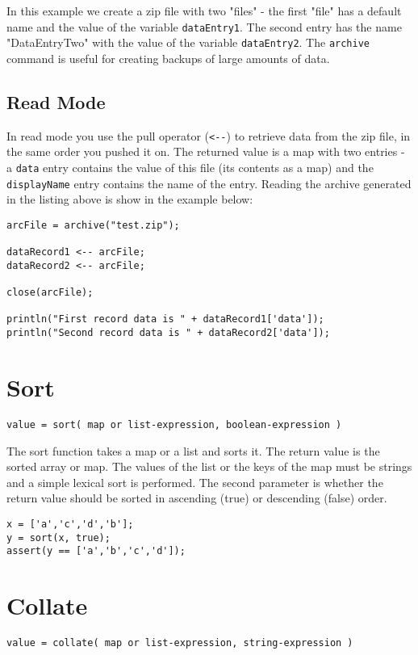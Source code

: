 In this example we create a zip file with two "files" - the first "file" has a default name and the value of the variable \Verb+dataEntry1+. The second entry has the name "DataEntryTwo" with the value of the variable \verb+dataEntry2+. The \verb+archive+ command is useful for creating backups of large amounts of \Rapture data.

\subsection{Read Mode}
In read mode you use the pull operator (\Verb+<--+) to retrieve data from the zip file, in the same order you pushed it on. The returned value is a map with two entries - a \verb+data+ entry contains the value of this file (its contents as a map) and the \verb+displayName+ entry contains the name of the entry. Reading the archive generated in the listing above is show in the example below:

\begin{lstlisting}[caption={Read from archive example}]
arcFile = archive("test.zip");

dataRecord1 <-- arcFile;
dataRecord2 <-- arcFile;

close(arcFile);

println("First record data is " + dataRecord1['data']);
println("Second record data is " + dataRecord2['data']);
\end{lstlisting}

\section{Sort}
\begin{Verbatim}
value = sort( map or list-expression, boolean-expression )
\end{Verbatim}
The sort function takes a map or a list and sorts it. The return value is the sorted array or map. The
values of the list or the keys of the map must be strings and a simple lexical sort is performed. The second
parameter is whether the return value should be sorted in ascending (true) or descending (false) order.

\begin{lstlisting}[caption={Sort example}]
x = ['a','c','d','b'];
y = sort(x, true);
assert(y == ['a','b','c','d']);
\end{lstlisting}

\section{Collate}
\begin{Verbatim}
value = collate( map or list-expression, string-expression )
\end{Verbatim}

